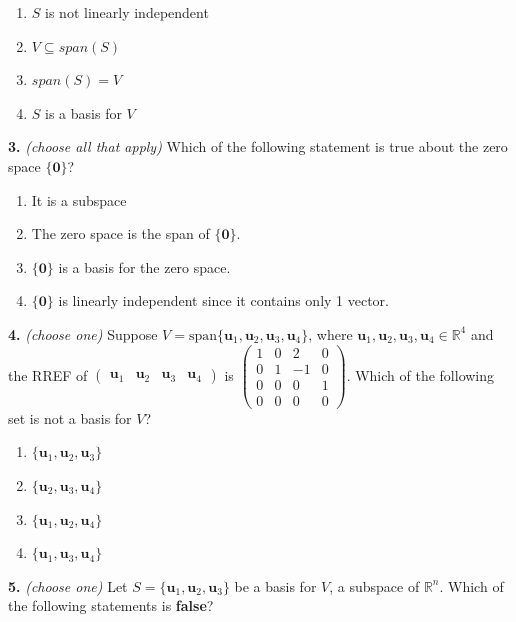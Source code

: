 \documentclass[10pt,a4paper]{article}
\begin{document}
\begin{enumerate}[label=(\Alph*)]
\item \(S\) is not linearly independent
\item \(V\subseteq span(S)\)
\item \(span(S)=V\)
\item \(S\) is a basis for \(V\)
\end{enumerate}
\smallskip
\textbf{3.} \textit{(choose all that apply)} Which of the following statement is true about the zero space \(\{\mathbf{0}\}\)?

\begin{enumerate}[label=(\Alph*)]
\item It is a subspace
\item The zero space is the span of \(\{\mathbf{0}\}\).
\item \(\{\mathbf{0}\}\) is a basis for the zero space.
\item \(\{\mathbf{0}\}\) is linearly independent since it contains only 1 vector.
\end{enumerate}
\smallskip
\textbf{4.} \textit{(choose one)} Suppose \(V=\text{span}\{\mathbf{u}_1,\mathbf{u}_2,\mathbf{u}_3,\mathbf{u}_4\}\), where \(\mathbf{u}_1,\mathbf{u}_2,\mathbf{u}_3,\mathbf{u}_4\in\mathbb{R}^4\) and the RREF of \(\left(\begin{array}{cccc}\mathbf{u}_1&\mathbf{u}_2&\mathbf{u}_3&\mathbf{u}_4\end{array}\right)\) is \(\begin{pmatrix}1&0&2&0\\0&1&-1&0\\0&0&0&1\\0&0&0&0\end{pmatrix}\). Which of the following set is not a basis for \(V\)?

\begin{enumerate}[label=(\Alph*)]
\item \(\{\mathbf{u}_1,\mathbf{u}_2,\mathbf{u}_3\}\)
\item \(\{\mathbf{u}_2,\mathbf{u}_3,\mathbf{u}_4\}\)
\item \(\{\mathbf{u}_1,\mathbf{u}_2,\mathbf{u}_4\}\)
\item \(\{\mathbf{u}_1,\mathbf{u}_3,\mathbf{u}_4\}\)
\end{enumerate}
\smallskip
\textbf{5.} \textit{(choose one)} Let \(S=\{\mathbf{u}_1,\mathbf{u}_2,\mathbf{u}_3\}\) be a basis for \(V\), a subspace of \(\mathbb{R}^n\). Which of the following statements is \textbf{false}?
\end{document}
